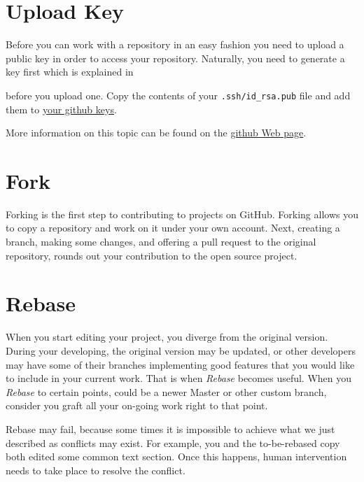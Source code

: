 \section{Upload Key}\label{upload-key}

Before you can work with a repository in an easy fashion you need to
upload a public key in order to access your repository. Naturally, you
need to generate a key first which is explained in 


before you upload one. Copy the contents of your
\verb|.ssh/id_rsa.pub| file and add them to
\href{https://github.com/settings/keys}{your github keys}.

More information on this topic can be found on the
\href{https://help.github.com/articles/adding-a-new-ssh-key-to-your-github-account/}{github
  Web page}.

\section{Fork}\label{fork}

Forking is the first step to contributing to projects on GitHub. Forking
allows you to copy a repository and work on it under your own account.
Next, creating a branch, making some changes, and offering a pull
request to the original repository, rounds out your contribution to the
open source project.


\section{Rebase}\label{rebase}

When you start editing your project, you diverge from the original
version. During your developing, the original version may be updated, or
other developers may have some of their branches implementing good
features that you would like to include in your current work. That is
when {\em Rebase} becomes useful. When you {\em Rebase} to certain points, could
be a newer Master or other custom branch, consider you graft all your
on-going work right to that point.

Rebase may fail, because some times it is impossible to achieve what we
just described as conflicts may exist. For example, you and the to-be-rebased copy
both edited some common text section. Once this happens, human
intervention needs to take place to resolve the conflict.

